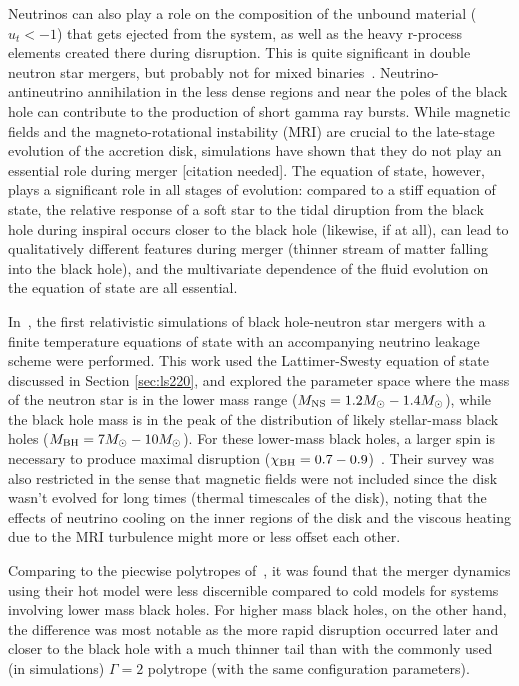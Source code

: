 Neutrinos can also play a role on the composition of the unbound material ($u_t < -1$) that gets ejected from the system, as well as the heavy r-process elements created there during disruption.
This is quite significant in double neutron star mergers, but probably not for mixed binaries~\cite{Roberts:2016}.
Neutrino-antineutrino annihilation in the less dense regions and near the poles of the black hole can contribute to the production of short gamma ray bursts.  
While magnetic fields and the magneto-rotational instability (MRI) are crucial to the late-stage evolution of the accretion disk, simulations have shown that they do not play an essential role during merger [citation needed].  
The equation of state, however, plays a significant role in all stages of evolution: compared to a stiff equation of state, the relative response of a soft star to the tidal diruption from the black hole during inspiral occurs closer to the black hole (likewise, if at all), can lead to qualitatively different features during merger (thinner stream of matter falling into the black hole), and the multivariate dependence of the fluid evolution on the equation of state are all essential.

In~\cite{Foucart:2014nda}, the first relativistic simulations of black hole-neutron star mergers with a finite temperature equations of state with an accompanying neutrino leakage scheme were performed.  
This work used the Lattimer-Swesty equation of state discussed in Section \ref{sec:ls220}, and explored the parameter space where the mass of the neutron star is in the lower mass range ($M_{\rm NS} = 1.2 M_\odot - 1.4 M_\odot$), while the black hole mass is in the peak of the distribution of likely stellar-mass black holes ($M_{\rm BH} = 7 M_\odot - 10 M_\odot$). 
For these lower-mass black holes, a larger spin is necessary to produce maximal disruption ($\chi_{\rm BH} = 0.7 - 0.9$)~\cite{Foucart2012}.  
Their survey was also restricted in the sense that magnetic fields were not included since the disk wasn't evolved for long times (thermal timescales of the disk), noting that the effects of neutrino cooling on the inner regions of the disk and the viscous heating due to the MRI turbulence might more or less offset each other.

Comparing to the piecwise polytropes of~\cite{hebeler2013equation}, it was found that the merger dynamics using their hot model were less discernible compared to cold models for systems involving lower mass black holes.  
For higher mass black holes, on the other hand, the difference was most notable as the more rapid disruption occurred later and closer to the black hole with a much thinner tail than with the commonly used (in simulations) $\Gamma = 2$ polytrope (with the same configuration parameters).

